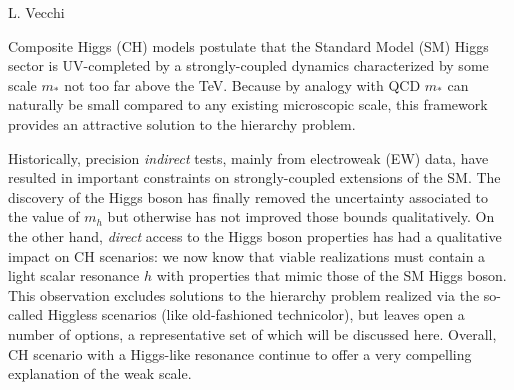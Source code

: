 \begin{center}
 {L. Vecchi}
\end{center}
\label{sec9:CHM}

Composite Higgs (CH) models postulate that the Standard Model (SM) Higgs sector is UV-completed by a strongly-coupled dynamics characterized by some scale $m_*$ not too far above the TeV. Because by analogy with QCD $m_*$ can naturally be small compared to any existing microscopic scale, this framework provides an attractive solution to the hierarchy problem. 

Historically, precision {\emph{indirect}} tests, mainly from electroweak (EW) data, have resulted in important constraints on strongly-coupled extensions of the SM. The discovery of the Higgs boson has finally removed the uncertainty associated to the value of $m_h$ but otherwise has not improved those bounds qualitatively. On the other hand, {\emph{direct}} access to the Higgs boson properties has had a qualitative impact on CH scenarios: we now know that viable realizations must contain a light scalar resonance $h$ with properties that mimic those of the SM Higgs boson. This observation excludes solutions to the hierarchy problem realized via the so-called Higgless scenarios (like old-fashioned technicolor), but leaves open a number of options, a representative set of which will be discussed here. Overall, CH scenario with a Higgs-like resonance continue to offer a very compelling explanation of the weak scale.




